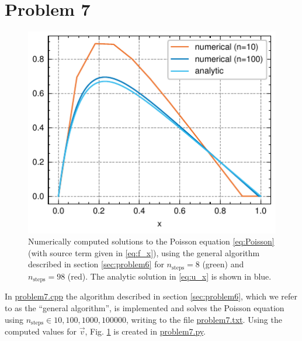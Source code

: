 \documentclass[english,notitlepage,reprint,nofootinbib]{revtex4-2}  %
\begin{document}
\section{Problem 7}
\begin{figure}[h!]
    \includegraphics{Figs/problem7.pdf}
    \caption{Numerically computed solutions to the Poisson equation \eqref{eq:Poisson} (with source term given in \eqref{eq:f_x}), using the general algorithm described in section \ref{sec:problem6} for \(n_{\text{steps}}=8\) (green) and \(n_{\text{steps}}=98\) (red). The analytic solution in \eqref{eq:u_x} is shown in blue.}
    \label{fig:v_x}
\end{figure}
In \href{https://github.com/isakrukan/FYS4150/blob/main/Project1/Code/problem7.cpp}{problem7.cpp} the algorithm described in section \ref{sec:problem6}, which we refer to as the ``general algorithm'', is implemented and solves the Poisson equation using \(n_{\text{steps}}\in {10, 100, 1000, 100000}\), writing to the file \href{https://github.com/isakrukan/FYS4150/blob/main/Project1/Code/problem7.txt}{problem7.txt}. Using the computed values for \(\vec{v}\), Fig. \ref{fig:v_x} is created in \href{https://github.com/isakrukan/FYS4150/blob/main/Project1/Code/problem7.py}{problem7.py}.
\end{document}
